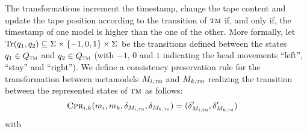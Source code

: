 The transformations increment the timestamp, change the tape content and update the tape position according to the transition of $\textsc{tm}$ if, and only if, the timestamp of one model is higher than the one of the other.
More formally, let $\operatorname{Tr}(q_1,q_2) \subseteq \Sigma \times \{ -1,0,1 \} \times \Sigma$ be the transitions defined between the states $q_1 \in Q_{\textsc{tm}}$ and $q_2 \in Q_{\textsc{tm}}$ (with $-1$, $0$ and $1$ indicating the head movements \enquote{left}, \enquote{stay} and \enquote{right}). 
We define a consistency preservation rule for the transformation between metamodels $M_{i, \textsc{tm}}$ and $M_{k, \textsc{tm}}$ realizing the transition between the represented states of $\textsc{tm}$ as follows:
\begin{align*}
    &
    \textsc{Cpr}_{i,k}(m_{i}, m_{k}, \delta_{M_{i,\textsc{tm}}}, \delta_{M_{k,\textsc{tm}}}) = (\delta_{M_{i,\textsc{tm}}}', \delta_{M_{k,\textsc{tm}}}')
\end{align*}
with
